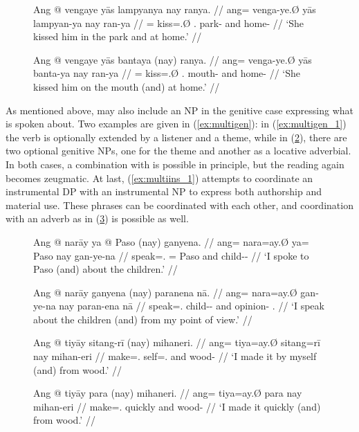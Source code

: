 \begin{figure}[h]
\pex\label{ex:multiplace_5}%
\a\label{ex:multiplace_5_1}%
\begingl
	\gla Ang @ vengaye yās lampyanya nay ranya. //
	\glb ang= venga-ye.Ø yās lampyan-ya nay ran-ya //
	\glc \AgtT{}= kiss=\TsgF{}.Ø \TsgM{}.\Parg{} park-\Loc{} and home-\Loc{} //
	\glft `She kissed him in the park and at home.' //
\endgl

\a\label{ex:multiplace_5_2}%
\begingl
	\gla Ang @ vengaye yās bantaya \textup{(\excl{}}nay\textup{)} ranya. //
	\glb ang= venga-ye.Ø yās banta-ya nay ran-ya //
	\glc \AgtT{}= kiss=\TsgF{}.Ø \TsgM{}.\Parg{} mouth-\Loc{} and 
		home-\Loc{}	//
	\glft `She kissed him on the mouth (\excl{}and) at home.' //
\endgl
\xe
\end{figure}

As mentioned above,  may also include an NP in the genitive
case expressing what is spoken about. Two examples are given in
(\ref{ex:multigen}): in (\ref{ex:multigen_1}) the verb is optionally extended
by a listener and a theme, while in (\ref{ex:multigen_2}), there are two
optional genitive NPs, one for the theme and another as a locative adverbial.
In both cases, a combination with  is possible in principle,
but the reading again becomes zeugmatic. At last, (\ref{ex:multiins_1})
attempts to coordinate an instrumental DP with an instrumental NP to express
both authorship and material use. These phrases can be coordinated with each
other, and coordination with an adverb as in (\ref{ex:multiins_2}) is possible
as well.

\begin{figure}[h]
\pex\label{ex:multigen}
\a\label{ex:multigen_1}%
\begingl
	\gla Ang @ narāy ya @ Paso \textup{(\excl{}}nay\textup{)} ganyena. //
	\glb ang= nara=ay.Ø ya= Paso nay gan-ye-na //
	\glc \AgtT{} speak=\Fsg{}.\Top{} \Loc{}= Paso and child-\Pl{}-\Gen{} //
	\glft `I spoke to Paso (\excl{}and) about the children.' //
\endgl

\a\label{ex:multigen_2}%
\begingl
	\gla Ang @ narāy ganyena \textup{(\excl{}}nay\textup{)} paranena nā. //
	\glb ang= nara=ay.Ø gan-ye-na nay paran-ena nā //
	\glc \AgtT{} speak=\Fsg{}.\Top{} child-\Pl{}-\Gen{} and opinion-\Gen{}
		\Fsg{}.\Gen{} //
	\glft `I speak about the children (\excl{}and) from my point of view.' //
\endgl
\xe
\end{figure}

\begin{figure}
\pex\label{ex:multiins}%
\a\label{ex:multiins_1}%
\begingl
	\gla Ang @ tiyāy sitang-rī \textup{(}nay\textup{)} mihaneri. //
	\glb ang= tiya=ay.Ø sitang=rī nay mihan-eri //
	\glc \AgtT{} make=\Fsg{}.\Top{} self=\Fsg{}.\Ins{} and wood-\Ins{} //
	\glft `I made it by myself (and) from wood.' //
\endgl

\a\label{ex:multiins_2}%
\begingl
	\gla Ang @ tiyāy para \textup{(}nay\textup{)} mihaneri. //
	\glb ang= tiya=ay.Ø para nay mihan-eri //
	\glc \AgtT{} make=\Fsg{}.\Top{} quickly and wood-\Ins{} //
	\glft `I made it quickly (and) from wood.' //
\endgl
\xe
\end{figure}


